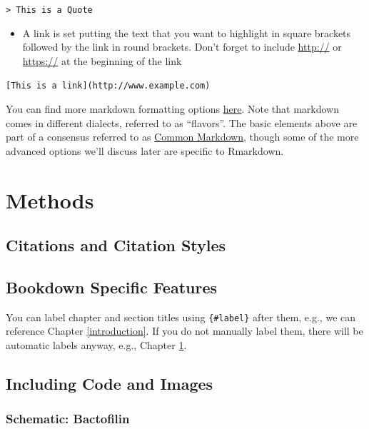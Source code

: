 \documentclass[]{tufte-book}
\providecommand{\tightlist}{%
  \setlength{\itemsep}{0pt}\setlength{\parskip}{0pt}}
\begin{document}
\texttt{\textgreater{}\ This\ is\ a\ Quote}

\begin{itemize}
\tightlist
\item
  A link is set putting the text that you want to highlight in square
  brackets followed by the link in round brackets. Don't forget to
  include \url{http://} or \url{https://} at the beginning of the link
\end{itemize}

\texttt{{[}This\ is\ a\ link{]}(http://www.example.com)}

You can find more markdown formatting options
\href{https://bookdown.org/yihui/rmarkdown/markdown-syntax.html}{here}.
Note that markdown comes in different dialects, referred to as
``flavors''. The basic elements above are part of a consensus referred
to as \href{http://commonmark.org/}{Common Markdown}, though some of the
more advanced options we'll discuss later are specific to Rmarkdown.

\hypertarget{methods}{\chapter{Methods}\label{methods}}

\section{Citations and Citation
Styles}\label{citations-and-citation-styles}

\section{Bookdown Specific Features}\label{bookdown-specific-features}

You can label chapter and section titles using \texttt{\{\#label\}}
after them, e.g., we can reference Chapter \ref{introduction}. If you do
not manually label them, there will be automatic labels anyway, e.g.,
Chapter \ref{methods}.

\section{Including Code and Images}\label{including-code-and-images}

\subsection*{Schematic: Bactofilin}\label{Bactofilin}
\end{document}
